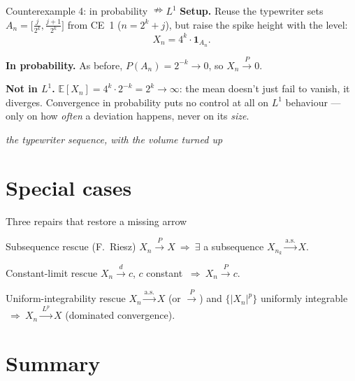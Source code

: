 \documentclass[aspectratio=169]{beamer}
\newcommand{\as}{\xrightarrow{\text{a.s.}}}
\newcommand{\inprob}{\xrightarrow{\ P\ }}
\newcommand{\inlaw}{\xrightarrow{\ d\ }}
\newcommand{\inLp}{\xrightarrow{\ L^p\ }}
\begin{document}
\begin{frame}{Counterexample 4: in probability $\nRightarrow L^1$}
  \textbf{Setup.} Reuse the typewriter sets $A_n = \big[\tfrac{j}{2^k},\tfrac{j+1}{2^k}\big]$
  from CE~1 ($n=2^k+j$), but raise the spike height with the level:
  \[ X_n = 4^k \cdot \mathbf 1_{A_n}. \]

  \textbf{In probability.} As before, $P(A_n) = 2^{-k} \to 0$, so $X_n \inprob 0$.

  \textbf{Not in $L^1$.} $\mathbb E[X_n] = 4^k \cdot 2^{-k} = 2^k \to \infty$: the mean
  doesn't just fail to vanish, it diverges. Convergence in probability puts no control
  at all on $L^1$ behaviour --- only on how \emph{often} a deviation happens, never on
  its \emph{size}.

  \vfill
  {\small\itshape the typewriter sequence, with the volume turned up}
\end{frame}

\section{Special cases}

\begin{frame}{Three repairs that restore a missing arrow}
  \begin{block}{Subsequence rescue (F.\ Riesz)}
    $X_n \inprob X \ \Rightarrow\ \exists$ a subsequence $X_{n_k} \as X$.
  \end{block}
  \begin{block}{Constant-limit rescue}
    $X_n \inlaw c$, $c$ constant $\ \Rightarrow\ X_n \inprob c$.
  \end{block}
  \begin{block}{Uniform-integrability rescue}
    $X_n \as X$ (or $\inprob$) and $\{|X_n|^p\}$ uniformly integrable
    $\ \Rightarrow\ X_n \inLp X$ (dominated convergence).
  \end{block}
\end{frame}

\section{Summary}
\end{document}
